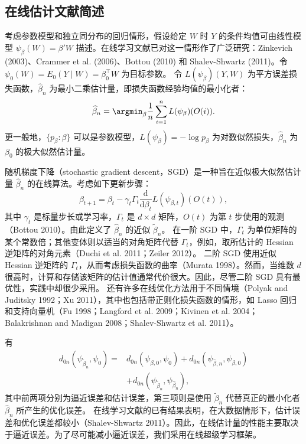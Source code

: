 
\subsection{在线估计文献简述}

考虑参数模型和独立同分布的回归情形，假设给定 $W$ 时 $Y$ 的条件均值可由线性模型
$\psi_\beta(W)=\beta'W$ 描述。在线学习文献已对这一情形作了广泛研究：Zinkevich (2003)、Crammer et al. (2006)、Bottou (2010) 和 Shalev-Shwartz (2011)。令
$\psi_0(W)=E_0(Y\mid W)=\beta_0^\top W$ 为目标参数。
令 $L(\psi_\beta)(Y,W)$ 为平方误差损失函数，$\widehat\beta_n$ 为最小二乘估计量，即损失函数经验均值的最小化者：
\[
\widehat\beta_n=\argmin_\beta\frac1n\sum_{i=1}^nL(\psi_\beta)(O(i)).
\]
更一般地，$\{p_\beta:\beta\}$ 可以是参数模型，$L(\psi_\beta)=-\log p_\beta$ 为对数似然损失，$\widehat\beta_n$ 为 $\beta_0$ 的极大似然估计量。

随机梯度下降（stochastic gradient descent，SGD）是一种旨在近似极大似然估计量 $\widehat\beta_n$ 的在线算法。考虑如下更新步骤：
\begin{equation}
\beta_{t+1}=\beta_t-\gamma_t\Gamma_t\frac{\mathrm d}{\mathrm d\beta_t}
 L(\psi_{\beta,t})(O(t)),
\tag{A.10}
\end{equation}
其中 $\gamma_t$ 是标量步长或学习率，$\Gamma_t$ 是 $d\times d$ 矩阵，$O(t)$ 为第 $t$ 步使用的观测（Bottou 2010）。由此定义了 $\widehat\beta_n$ 的近似 $\widetilde\beta_n$。
在一阶 SGD 中，$\Gamma_t$ 为单位矩阵的某个常数倍；其他变体则以适当的对角矩阵代替 $\Gamma_t$，例如，取所估计的 Hessian 逆矩阵的对角元素（Duchi et al. 2011；Zeiler 2012）。
二阶 SGD 使用近似 Hessian 逆矩阵的 $\Gamma_t$，从而考虑损失函数的曲率（Murata 1998）。然而，当维数 $d$ 很高时，计算和存储该矩阵的估计值通常代价很大。因此，尽管二阶 SGD 具有最优性，实践中却很少采用。
还有许多在线优化方法用于不同情境（Polyak and Juditsky 1992；Xu 2011），其中也包括带正则化损失函数的情形，如 Lasso 回归和支持向量机（Fu 1998；Langford et al. 2009；Kivinen et al. 2004；Balakrishnan and Madigan 2008；Shalev-Shwartz et al. 2011）。

有
\[
\begin{aligned}
d_{0n}(\psi_{\widetilde\beta_n},\psi_0)
={}&d_{0n}(\psi_{\beta,0},\psi_0)
 +d_{0n}(\psi_{\widehat\beta,n},\psi_{\beta,0})\\
&+d_{0n}(\psi_{\widetilde\beta_n},\psi_{\widehat\beta_n}),
\end{aligned}
\]
其中前两项分别为逼近误差和估计误差，第三项则是使用 $\widetilde\beta_n$ 代替真正的最小化者 $\widehat\beta_n$ 所产生的优化误差。
在线学习文献的已有结果表明，在大数据情形下，估计误差和优化误差都较小（Shalev-Shwartz 2011）。因此，在线估计量的性能主要取决于逼近误差。为了尽可能减小逼近误差，我们采用在线超级学习框架。

